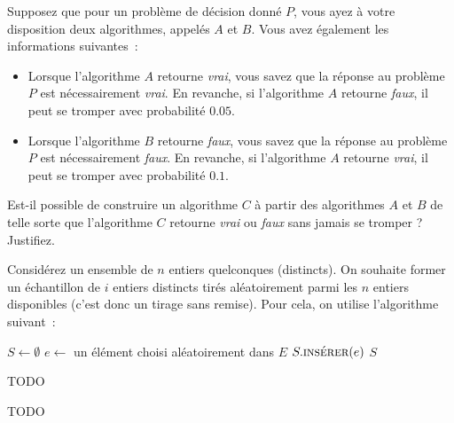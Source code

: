 \documentclass[12pt,addpoints]{exam}
\newcommand{\bigo}{\mathcal{O}}
\begin{document}
\begin{questions}
\question
Supposez que pour un problème de décision donné $P$, vous ayez à votre disposition deux algorithmes, appelés $A$ et $B$. Vous avez également les informations suivantes~:
\begin{itemize}
  \item Lorsque l'algorithme $A$ retourne \emph{vrai}, vous savez que la réponse au problème $P$ est nécessairement \emph{vrai}. En revanche, si l'algorithme $A$ retourne \emph{faux}, il peut se tromper avec probabilité $0.05$.
  \item Lorsque l'algorithme $B$ retourne \emph{faux}, vous savez que la réponse au problème $P$ est nécessairement \emph{faux}. En revanche, si l'algorithme $A$ retourne \emph{vrai}, il peut se tromper avec probabilité $0.1$.
\end{itemize}
Est-il possible de construire un algorithme $C$ à partir des algorithmes $A$ et $B$ de telle sorte que l'algorithme $C$ retourne \emph{vrai} ou \emph{faux} sans jamais se tromper ? Justifiez.

\question
Considérez un ensemble de $n$ entiers quelconques (distincts). On souhaite former un échantillon de $i$ entiers distincts tirés aléatoirement parmi les $n$ entiers disponibles (c'est donc un tirage sans remise). Pour cela, on utilise l'algorithme suivant~:
\begin{algorithmic}[1]
    \State $S \gets \emptyset$
      \State $e \gets $ un élément choisi aléatoirement dans $E$
        \State $S.\Call{insérer}{e}$
      \EndIf
    \EndWhile
    \State \Return $S$
  \EndFunction
\end{algorithmic}

%
\question
TODO

%
\question
TODO

\end{questions}
\end{document}
